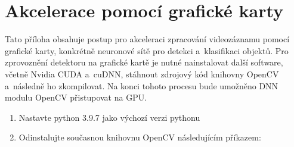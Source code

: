 \chapter{Akcelerace pomocí grafické karty}
Tato příloha obsahuje postup pro akceleraci zpracování videozáznamu pomocí grafické karty, konkrétně neuronové sítě pro detekci a~klasifikaci objektů. Pro zprovoznění detektoru na grafické kartě je nutné nainstalovat další software, včetně Nvidia CUDA a~cuDNN, stáhnout zdrojový kód knihovny OpenCV a~následně ho zkompilovat. Na konci tohoto procesu bude umožněno DNN modulu OpenCV přistupovat na GPU.

\begin{enumerate}
    \item Nastavte python 3.9.7 jako výchozí verzi pythonu
    \item Odinstalujte současnou knihovnu OpenCV následujícím příkazem: 
    

\end{enumerate}
